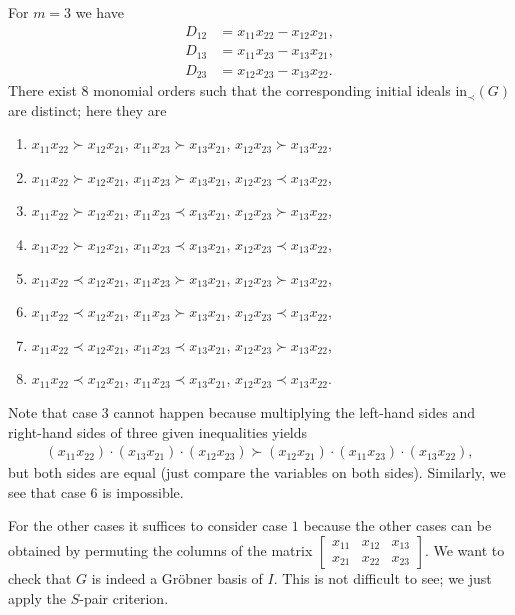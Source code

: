 \documentclass[a4paper, 11pt]{article}
\begin{document}
\begin{eg}
For \( m = 3 \) we have 
\begin{align*}
  D_{12} &=  x_{11}x_{22} - x_{12}x_{21},\\
   D_{13}&=  x_{11}x_{23} - x_{13}x_{21}, \\
   D_{23} &=  x_{12}x_{23} - x_{13}x_{22}.
\end{align*}
There exist 8 monomial orders such that the corresponding initial ideals \( \mathrm{in}_\prec(G) \) are distinct; here they are
\begin{enumerate}
  \item \( x_{11}x_{22} \succ x_{12}x_{21} \), \( x_{11}x_{23} \succ x_{13}x_{21} \), \( x_{12}x_{23} \succ x_{13}x_{22} \),
  \item \( x_{11}x_{22} \succ x_{12}x_{21} \), \( x_{11}x_{23} \succ x_{13}x_{21} \), \( x_{12}x_{23} \prec x_{13}x_{22} \),
  \item \( x_{11}x_{22} \succ x_{12}x_{21} \), \( x_{11}x_{23} \prec x_{13}x_{21} \), \( x_{12}x_{23} \succ x_{13}x_{22} \),
  \item \( x_{11}x_{22} \succ x_{12}x_{21} \), \( x_{11}x_{23} \prec x_{13}x_{21} \), \( x_{12}x_{23} \prec x_{13}x_{22} \),
  \item \( x_{11}x_{22} \prec x_{12}x_{21} \), \( x_{11}x_{23} \succ x_{13}x_{21} \), \( x_{12}x_{23} \succ x_{13}x_{22} \),
  \item \( x_{11}x_{22} \prec x_{12}x_{21} \), \( x_{11}x_{23} \succ x_{13}x_{21} \), \( x_{12}x_{23} \prec x_{13}x_{22} \),
  \item \( x_{11}x_{22} \prec x_{12}x_{21} \), \( x_{11}x_{23} \prec x_{13}x_{21} \), \( x_{12}x_{23} \succ x_{13}x_{22} \),
  \item \( x_{11}x_{22} \prec x_{12}x_{21} \), \( x_{11}x_{23} \prec x_{13}x_{21} \), \( x_{12}x_{23} \prec x_{13}x_{22} \).
\end{enumerate}
Note that case \( 3 \) cannot happen because multiplying the left-hand sides and right-hand sides of three given inequalities yields
\begin{align*}
   (x_{11}x_{22})\cdot(x_{13}x_{21})\cdot(x_{12}x_{23}) \succ (x_{12}x_{21})\cdot(x_{11}x_{23}) \cdot (x_{13}x_{22}),
\end{align*}
but both sides are equal (just compare the variables on both sides). Similarly, we see that case \( 6 \) is impossible.

For the other cases it suffices to consider case \( 1 \) because the other cases can be obtained by permuting the columns of the matrix \( \begin{bmatrix}
  x_{11} & x_{12} & x_{13} \\
  x_{21} & x_{22} & x_{23}
\end{bmatrix} \). We want to check that \( G \) is indeed a Gröbner basis of \( I \). This is not difficult to see; we just apply the \( S \)-pair criterion.


\end{eg}
\end{document}
